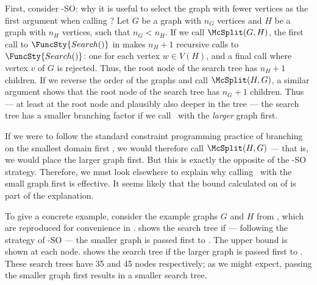 First, consider \McSplit-SO: why it is useful to select the graph with
fewer vertices as the first argument when calling \McSplit?  Let $G$ be a graph
with $n_G$ vertices and $H$ be a graph with $n_H$ vertices, such that $n_G <
n_H$.  If we call $\McSplit(G,H)$, the first call to $\FuncSty{Search()}$ in
 makes $n_H + 1$ recursive calls to $\FuncSty{Search()}$: one
for each vertex $w \in V(H)$, and a final call where vertex $v$ of $G$ is
rejected.  Thus, the root node of the search tree has $n_H + 1$ children. If we
reverse the order of the graphs and call $\McSplit(H,G)$, a similar argument
shows that the root node of the search tree has $n_G + 1$ children.  Thus ---
at least at the root node and plausibly also deeper in the tree --- the search
tree has a smaller branching factor if we call \McSplit\ with the \emph{larger}
graph first.

If we were to follow the standard constraint programming practice of branching
on the smallest domain first \cite{DBLP:journals/ai/HaralickE80}, we would 
therefore call $\McSplit(H,G)$ --- that is, we would place the larger graph first.
But this is exactly the opposite of the \McSplit-SO strategy.
Therefore, we must look elsewhere to explain why calling \McSplit\ with the small
graph first is effective.  It seems likely that the bound calculated on 
of  is part of the explanation.

To give a concrete example, consider the example graphs $G$ and $H$ from
, which are reproduced for convenience in .
 shows the search tree if --- following the
strategy of \McSplit-SO --- the smaller graph is passed first to \McSplit.
The upper bound is shown at each node.
 shows the search tree if the larger graph
is passed first to \McSplit.  These search trees have 35 and 45 nodes respectively;
as we might expect, passing the smaller graph first results in a smaller search tree.

